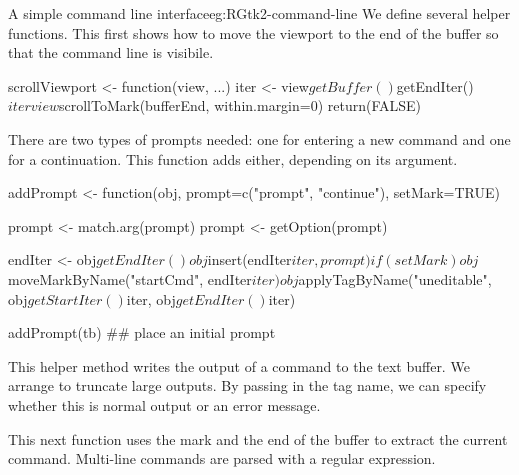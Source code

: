 \begin{example}{A simple command line interface}{eg:RGtk2-command-line}
We define several helper functions. This first shows how to move the
viewport to the end of the buffer so that the command line is visibile.
\begin{Schunk}
\begin{Sinput}
 scrollViewport <- function(view, ...) {
   iter <- view$getBuffer()$getEndIter()$iter
   view$scrollToMark(bufferEnd, within.margin=0)
   return(FALSE)
 }
\end{Sinput}
\end{Schunk}

There are two types of prompts needed: one for entering a new command
and one for a continuation. This function adds either, depending on
its argument.
\begin{Schunk}
\begin{Sinput}
 addPrompt <- function(obj, prompt=c("prompt", "continue"),
                       setMark=TRUE) 
 {
   prompt <- match.arg(prompt)
   prompt <- getOption(prompt)
   
   endIter <- obj$getEndIter()
   obj$insert(endIter$iter, prompt)
   if(setMark)
     obj$moveMarkByName("startCmd", endIter$iter)
   obj$applyTagByName("uneditable", obj$getStartIter()$iter, 
                      obj$getEndIter()$iter)
 }
 addPrompt(tb) ## place an initial prompt
\end{Sinput}
\end{Schunk}

This helper method writes the output of a command to the text
buffer. We arrange to truncate large outputs. By passing in the tag
name, we can specify whether this is normal output or an error
message.
\begin{Schunk}
\end{Schunk}

This next function uses the  mark and the end of the buffer
to extract the current command. Multi-line commands are parsed with a
regular expression.
\begin{Schunk}
\end{Schunk}


\end{example}
